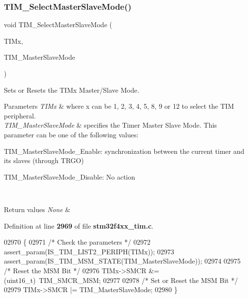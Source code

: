 \subsubsection{T\+I\+M\+\_\+\+Select\+Master\+Slave\+Mode()}
{\footnotesize\ttfamily void T\+I\+M\+\_\+\+Select\+Master\+Slave\+Mode (\begin{DoxyParamCaption}\item[{\textbf{ T\+I\+M\+\_\+\+Type\+Def} $\ast$}]{T\+I\+Mx,  }\item[{uint16\+\_\+t}]{T\+I\+M\+\_\+\+Master\+Slave\+Mode }\end{DoxyParamCaption})}



Sets or Resets the T\+I\+Mx Master/\+Slave Mode. 


\begin{DoxyParams}{Parameters}
{\em T\+I\+Mx} & where x can be 1, 2, 3, 4, 5, 8, 9 or 12 to select the T\+IM peripheral. \\
\hline
{\em T\+I\+M\+\_\+\+Master\+Slave\+Mode} & specifies the Timer Master Slave Mode. This parameter can be one of the following values\+: \begin{DoxyItemize}
\item T\+I\+M\+\_\+\+Master\+Slave\+Mode\+\_\+\+Enable\+: synchronization between the current timer and its slaves (through T\+R\+GO) \item T\+I\+M\+\_\+\+Master\+Slave\+Mode\+\_\+\+Disable\+: No action \end{DoxyItemize}
\\
\hline
\end{DoxyParams}

\begin{DoxyRetVals}{Return values}
{\em None} & \\
\hline
\end{DoxyRetVals}


Definition at line \textbf{ 2969} of file \textbf{ stm32f4xx\+\_\+tim.\+c}.


\begin{DoxyCode}
02970 \{
02971   \textcolor{comment}{/* Check the parameters */}
02972   assert_param(IS_TIM_LIST2_PERIPH(TIMx));
02973   assert_param(IS_TIM_MSM_STATE(TIM\_MasterSlaveMode));
02974 
02975   \textcolor{comment}{/* Reset the MSM Bit */}
02976   TIMx->SMCR &= (uint16\_t)~TIM_SMCR_MSM;
02977   
02978   \textcolor{comment}{/* Set or Reset the MSM Bit */}
02979   TIMx->SMCR |= TIM\_MasterSlaveMode;
02980 \}
\end{DoxyCode}
\mbox{\label{group__TIM__Group7_ga28745aaa549e2067e42c19569209e6c6}} 
